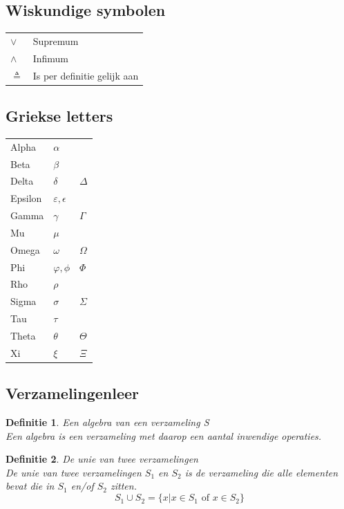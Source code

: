 \documentclass[a4paper]{article}
\newtheorem{tdefinitie}{Definitie}[section]
\newenvironment{definitie}[1]%
  {\begin{mdframed}[backgroundcolor=silver,
    topline=false,
    rightline=false,
    leftline=false,
    bottomline=false]\begin{tdefinitie}#1\\\normalfont}%
  {\end{tdefinitie}\end{mdframed}}
\newcommand{\of}{\ensuremath{\text{ of }}}
\begin{document}
\subsection{Wiskundige symbolen}

\begin{tabular}{l|l}
	$\vee$ & Supremum \\
	$\wedge$ & Infimum \\
	$\triangleq$ & Is per definitie gelijk aan \\
\end{tabular}

\subsection{Griekse letters}

\begin{tabular}{l|l|l}
	Alpha & $\alpha$ & \\
	Beta & $\beta$ & \\
	Delta & $\delta$ & $\Delta$ \\
	Epsilon & $\varepsilon, \epsilon$ & \\
	Gamma & $\gamma$ & $\Gamma$ \\
	Mu & $\mu$ & \\
	Omega & $\omega$ & $\Omega$ \\
	Phi & $\varphi, \phi$ & $\Phi$ \\
	Rho & $\rho$ & \\
	Sigma & $\sigma$ & $\Sigma$ \\
	Tau & $\tau$ & \\
	Theta & $\theta$ & $\Theta$ \\
	Xi & $\xi$ & $\Xi$ \\
\end{tabular}

\subsection{Verzamelingenleer}

\begin{definitie}{Een algebra van een verzameling S}
Een algebra is een verzameling met daarop een aantal inwendige operaties.
\end{definitie}

\begin{definitie}{De unie van twee verzamelingen}
  De unie van twee verzamelingen $S_1$ en $S_2$ is de verzameling die alle elementen bevat die in $S_1$ en/of $S_2$ zitten.
  \begin{equation*}
  S_1 \cup S_2 = \{x|x \in S_1 \of x \in S_2\}
  \end{equation*}
\end{definitie}
\end{document}
